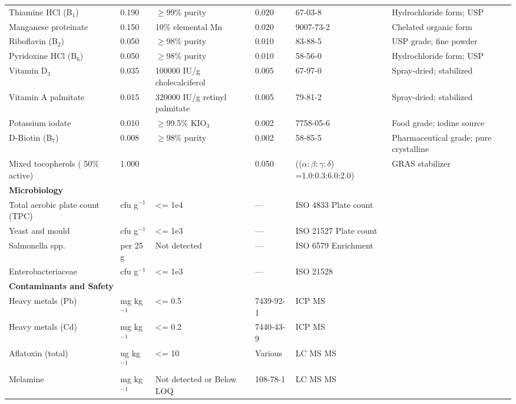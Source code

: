 \begin{longtable}{@{}p{6.0cm}p{1.5cm}p{1.8cm}p{2.0cm}p{3.0cm}p{3.0cm}@{}}
Thiamine HCl (B$_1$) & 0.190 & $\ge$99\% purity & 0.020 & 67-03-8 & Hydrochloride form; USP \\[3pt]
Manganese proteinate & 0.150 & 10\% elemental Mn & 0.020 & 9007-73-2 & Chelated organic form \\[3pt]
Riboflavin (B$_2$) & 0.050 & $\ge$98\% purity & 0.010 & 83-88-5 & USP grade; fine powder \\[3pt]
Pyridoxine HCl (B$_6$) & 0.050 & $\ge$98\% purity & 0.010 & 58-56-0 & Hydrochloride form; USP \\[3pt]
Vitamin D$_3$ & 0.035 & 100000 IU/g cholecalciferol & 0.005 & 67-97-0 & Spray-dried; stabilized \\[3pt]
Vitamin A palmitate & 0.015 & 320000 IU/g retinyl palmitate & 0.005 & 79-81-2 & Spray-dried; stabilized \\[3pt]
Potassium iodate & 0.010 & $\ge$99.5\% KIO$_3$ & 0.002 & 7758-05-6 & Food grade; iodine source \\[3pt]
D-Biotin (B$_7$) & 0.008 & $\ge$98\% purity & 0.002 & 58-85-5 & Pharmaceutical grade; pure crystalline \\[3pt]
\midrule
Mixed tocopherols ( 50\% active) & 1.000 &  & 0.050 & (($\alpha:\beta:\gamma:\delta$) =1.0:0.3:6.0:2.0) &  GRAS stabilizer \\[3pt]
\midrule

\multicolumn{6}{l}{\textbf{Microbiology}} \\[3pt]
Total aerobic plate count (TPC) & cfu g$^{-1}$ & <= 1e4 & --- & ISO 4833 Plate count & \\[3pt]
Yeast and mould & cfu g$^{-1}$ & <= 1e3 & --- & ISO 21527 Plate count & \\[3pt]
Salmonella spp. & per 25 g & Not detected & --- & ISO 6579 Enrichment & \\[3pt]
Enterobacteriaceae & cfu g$^{-1}$ & <= 1e3 & --- & ISO 21528 & \\[6pt]

\multicolumn{6}{l}{\textbf{Contaminants and Safety}} \\[3pt]
Heavy metals (Pb) & mg kg$^{-1}$ & <= 0.5 & 7439-92-1 & ICP MS & \\[3pt]
Heavy metals (Cd) & mg kg$^{-1}$ & <= 0.2 & 7440-43-9 & ICP MS & \\[3pt]
Aflatoxin (total) & ug kg$^{-1}$ & <= 10 & Various & LC MS MS & \\[3pt]
Melamine & mg kg$^{-1}$ & Not detected or Below LOQ & 108-78-1 & LC MS MS & \\[6pt]


\end{longtable}
